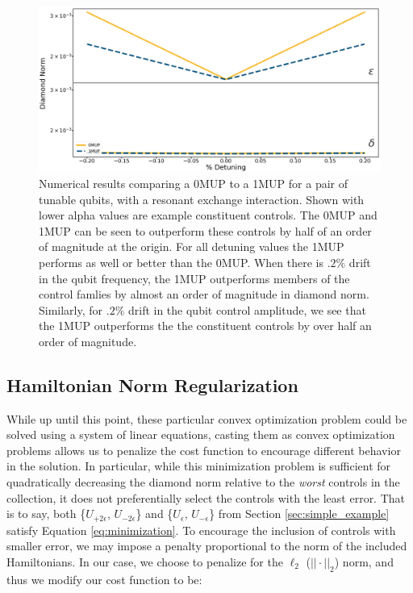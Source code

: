\documentclass[aps,nofootinbib,pra,notitlepage,twocolumn]{revtex4-1}
\begin{document}
\begin{figure}
  \centering
  \includegraphics[width=\columnwidth]{2QRBC_no_member.png}
  \caption{Numerical results comparing a 0MUP to a 1MUP for a pair of tunable qubits, with a resonant exchange interaction. Shown with lower alpha values are example constituent controls. The 0MUP and 1MUP can be seen to outperform these controls by half of an order of magnitude at the origin. For all detuning values the 1MUP performs as well or better than the 0MUP. When there is $.2\%$ drift in the qubit frequency, the 1MUP outperforms members of the control famlies by almost an order of magnitude in diamond norm. Similarly, for $.2\%$ drift in the qubit control amplitude, we see that the 1MUP outperforms the the constituent controls by over half an order of magnitude.}
  \label{fig:2MUP}
\end{figure}


\subsection{Hamiltonian Norm Regularization}
\label{sec:norm}
While up until this point, these particular convex optimization problem could be solved using a system of linear equations, casting them as convex optimization problems allows us to penalize the cost function to encourage different behavior in the solution. In particular, while this minimization problem is sufficient for quadratically decreasing the diamond norm relative to the \textit{worst} controls in the collection, it does not preferentially select the controls with the least error. That is to say, both \{$U_{+2\epsilon}$, $U_{-2\epsilon}$\} and \{$U_{\epsilon}$, $U_{-\epsilon}$\} from Section \ref{sec:simple_example} satisfy Equation \ref{eq:minimization}. To encourage the inclusion of controls with smaller error, we may impose a penalty proportional to the norm of the included Hamiltonians. In our case, we choose to penalize for the $\ell_2$ ($||\cdot||_2$) norm, and thus we modify our cost function to be:
\end{document}
